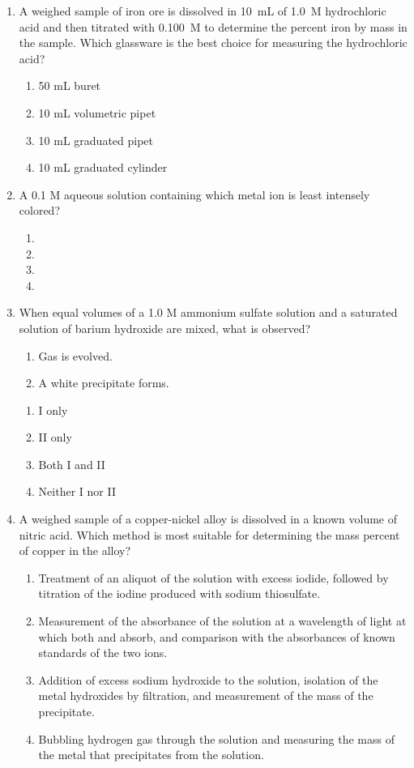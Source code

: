 \documentclass[twocolumn,10pt]{article}
\begin{document}
\begin{enumerate}[label=\arabic*., leftmargin=*]
\item A weighed sample of iron ore is dissolved in 10~mL of 1.0~M hydrochloric acid and then titrated with 0.100~M  to determine the percent iron by mass in the sample. Which glassware is the best choice for measuring the hydrochloric acid?
\begin{enumerate}[label=(\Alph*)]
    \item 50 mL buret \item 10 mL volumetric pipet \item 10 mL graduated pipet \item 10 mL graduated cylinder
\end{enumerate}

\item A 0.1 M aqueous solution containing which metal ion is least intensely colored?
\begin{enumerate}[label=(\Alph*)]
    \item {} \item {} \item {} \item {}
\end{enumerate}

\item When equal volumes of a 1.0 M ammonium sulfate solution and a saturated solution of barium hydroxide are mixed, what is observed?
\begin{enumerate}[label=\Roman*.]
    \item Gas is evolved.
    \item A white precipitate forms.
\end{enumerate}
\begin{enumerate}[label=(\Alph*)]
    \item I only \item II only \item Both I and II \item Neither I nor II
\end{enumerate}

\item A weighed sample of a copper-nickel alloy is dissolved in a known volume of nitric acid. Which method is most suitable for determining the mass percent of copper in the alloy?
\begin{enumerate}[label=(\Alph*)]
    \item Treatment of an aliquot of the solution with excess iodide, followed by titration of the iodine produced with sodium thiosulfate.
    \item Measurement of the absorbance of the solution at a wavelength of light at which both  and  absorb, and comparison with the absorbances of known standards of the two ions.
    \item Addition of excess sodium hydroxide to the solution, isolation of the metal hydroxides by filtration, and measurement of the mass of the precipitate.
    \item Bubbling hydrogen gas through the solution and measuring the mass of the metal that precipitates from the solution.
\end{enumerate}


\end{enumerate}
\end{document}

